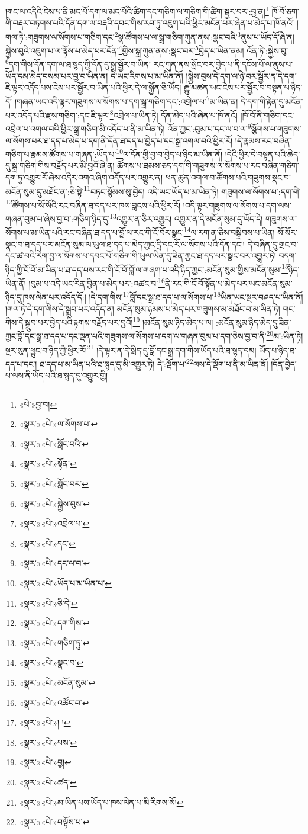 །གང་ལ་འདིའི་ངེས་པ་ནི་མང་པོ་དག་ལ་མང་པོའི་ཚིག་དང་གཅིག་ལ་གཅིག་གི་ཚིག་སྦྱར་བར་:བྱ་ན།\footnote{«པེ་»བྱ་བ།} ཁོ་བོ་ཅག་གི་བརྡར་བཏགས་པའི་དོན་དག་ལ་བརྡའི་དབང་གིས་རབ་ཏུ་འཇུག་པའི་ཕྱིར་མངོན་པར་ཞེན་པ་མེད་པ་ཁོ་ནའོ། །གལ་ཏེ་:གཟུགས་ལ་སོགས་པ་གཅིག་དང་\footnote{«སྣར་»«པེ་»ལ་སོགས་པ་}སྣ་ཚོགས་པ་ལ་སྒྲ་གཅིག་ཀུན་ནས་:སྣང་བའི་\footnote{«སྣར་»«པེ་»སློང་བའི་}ནུས་པ་ཡོད་དོ་ཞེ་ན། སྐྱེས་བུའི་འཇུག་པ་ལ་ལྟོས་པ་མེད་པར་དོན་\footnote{«སྣར་»«པེ་»སྟོན་}གྱིས་སྒྲ་ཀུན་ནས་:སྣང་བར་\footnote{«སྣར་»«པེ་»སློང་བར་}བྱེད་པ་ཡིན་ནམ། འོན་ཏེ་:སྐྱེས་བུ་\footnote{«སྣར་»«པེ་»སྐྱེས་བུས་}དག་གིས་དོན་དག་ལ་ཐ་སྙད་ཀྱི་དོན་དུ་སྒྲ་སྦྱོར་བ་ཡིན། རང་ཀུན་ནས་སློང་བར་བྱེད་པ་ནི་དངོས་པོ་ལ་ནུས་པ་ཡོད་དམ་མེད་བསམ་པར་བྱ་བ་ཡིན་ན། དེ་ཡང་རིགས་པ་མ་ཡིན་ནོ། །སྐྱེས་བུས་དེ་དག་ལ་ཉེ་བར་སྦྱོར་ན་དེ་དག་ཇི་ལྟར་འདོད་པས་ངེས་པར་སྦྱོར་བ་ཡིན་པའི་ཕྱིར་དེ་ལ་སྐྱོན་ཅི་ཡོད། རྒྱུ་མཚན་ཡང་ངེས་པར་སྦྱོར་བ་བསྟན་པ་ཉིད་དོ། །གཞན་ཡང་འདི་ལྟར་གཟུགས་ལ་སོགས་པ་དག་སྒྲ་གཅིག་དང་:འགྲེལ་པ་\footnote{«སྣར་»«པེ་»འབྲེལ་པ་}མ་ཡིན་ན། དེ་དག་གི་རྟེན་དུ་མངོན་པར་འདོད་པའི་རྫས་གཅིག་:དང་ཇི་ལྟར་\footnote{«སྣར་»«པེ་»དང་}འབྲེལ་པ་ཡིན་ཏེ། དོན་མེད་པའི་ཞེན་པ་ཁོ་ནའོ། །ཁོ་བོ་ནི་གཅིག་དང་འབྲེལ་པ་འགལ་བའི་ཕྱིར་སྒྲ་གཅིག་མི་འདོད་པ་ནི་མ་ཡིན་ཏེ། འོན་ཀྱང་:བུམ་པ་དང་ལ་བ་ལ་\footnote{«སྣར་»«པེ་»དང་ལ་བ་}སྩོགས་པ་གཟུགས་ལ་སོགས་པར་ཐ་དད་པ་མེད་པ་དག་ནི་དོན་ཐ་དད་པ་བྱེད་པ་དང་སྒྲ་འགལ་བའི་ཕྱིར་རོ། །དེ་རྣམས་རང་བཞིན་གཅིག་པ་རྣམས་ཚོགས་པ་གཞན་:ཡོད་པ་\footnote{«སྣར་»«པེ་»ཡོད་པ་མ་ཡིན་པ་}ལ་དོན་གྱི་བྱ་བ་བྱེད་པ་ཉིད་མ་ཡིན་ནོ། །དེའི་ཕྱིར་དེ་བསྟན་པའི་ཆེད་དུ་སྒྲ་གཅིག་གིས་བརྗོད་པར་མི་བྱའོ་ཞེ་ན། ཚོགས་པ་ཐམས་ཅད་དག་གི་གཟུགས་ལ་སོགས་པ་རང་བཞིན་གཅིག་དག་ཏུ་འགྱུར་རོ་ཞེས་འདིར་འགའ་ཞིག་འདོད་པར་འགྱུར་ན། ཕན་ཚུན་འགལ་བ་ཚོགས་པའི་གཟུགས་སྣང་བ་མངོན་སུམ་དུ་མཐོང་ན་:ཅི་སྟེ་\footnote{«སྣར་»«པེ་»ཅི་དེ་}བཏང་སྙོམས་སུ་བྱེད། འདི་ཡང་ཡོད་པ་མ་ཡིན་ཏེ། གཟུགས་ལ་སོགས་པ་:དག་གི་\footnote{«སྣར་»«པེ་»དག་གིས་}ཚོགས་པ་སོ་སོའི་རང་བཞིན་ཐ་དད་པར་ཁས་བླངས་པའི་ཕྱིར་རོ། །འདི་ལྟར་གཟུགས་ལ་སོགས་པ་དག་ལས་གཞན་བུམ་པ་ཞེས་བྱ་བ་:གཅིག་ཉིད་དུ་\footnote{«སྣར་»«པེ་»གཅིག་ཏུ་}འགྱུར་ན་ཅིར་འགྱུར། འགྱུར་ན་དེ་མངོན་སུམ་དུ་ཡོད་དེ། གཟུགས་ལ་སོགས་པ་མ་ཡིན་པའི་རང་བཞིན་ཐ་དད་པ་བློ་ལ་རང་གི་ངོ་བོར་སྣང་\footnote{«སྣར་»«པེ་»སྣང་བ་}ལ་རག་ན་ཅིས་བསྒྲིབས་པ་ཡིན། སོ་སོར་སྣང་བ་ཐ་དད་པར་མངོན་སུམ་ལ་ཡུལ་ཐ་དད་པ་མེད་ཀྱང་དྲི་དང་རོ་ལ་སོགས་པའི་དོན་དང་། དེ་བཞིན་དུ་གྲང་བ་དང་ཚ་བའི་རེག་བྱ་ལ་སོགས་པ་དབང་པོ་གཅིག་གི་ཡུལ་ཡིན་དུ་ཟིན་ཀྱང་ཐ་དད་པར་སྣང་བར་འགྱུར་ཏེ། བདག་ཉིད་ཀྱི་ངོ་བོ་མ་ཡིན་པ་ཐ་དད་པས་རང་གི་ངོ་བོ་བློ་ལ་གཞག་པ་འདི་ཉིད་ཀྱང་:མངོན་སུམ་གྱིས་མངོན་སུམ་\footnote{«སྣར་»«པེ་»མངོན་སུམ་}ཉིད་ཡིན་ནོ། །བུམ་པ་འདི་ཡང་རིན་བྱིན་པ་མེད་པར་:འཚང་བ་\footnote{«སྣར་»«པེ་»འཚོང་བ་}ནི་རང་གི་ངོ་བོ་སྟོན་པ་མེད་པར་ཡང་མངོན་སུམ་ཉིད་དུ་ཁས་ལེན་པར་འདོད་དོ:། །དེ་དག་གིས་\footnote{«སྣར་»«པེ་»། །}བློ་དང་སྒྲ་ཐ་དད་པ་ལ་སོགས་པ་\footnote{«སྣར་»«པེ་»པས་}ཡིན་ཡང་སྔར་བཤད་པ་ཡིན་ནོ། །གལ་ཏེ་དེ་དག་གིས་དེ་སྒྲུབ་པར་འདོད་ན། མངོན་སུམ་ཉམས་པ་མེད་པར་གཟུགས་མ་མཐོང་བ་མ་ཡིན་ཏེ། གང་གིས་དེ་སྒྲུབ་པར་བྱེད་པའི་རྟགས་བརྗོད་པར་བྱའོ།\footnote{«སྣར་»«པེ་»བྱ།} །མངོན་སུམ་ཉིད་མེད་པ་ལ། :མངོན་སུམ་ཉིད་མེད་དུ་ཟིན་ཀྱང་བློ་དང་སྒྲ་ཐ་དད་པ་དང་ལྡན་པའི་གཟུགས་ལ་སོགས་པ་དག་ལ་གཞན་བུམ་པ་དག་ཅེས་བྱ་བ་ནི་\footnote{«སྣར་»«པེ་»ཚད་}མ་:ཡིན་ཏེ། སྔར་སུན་ཕྱུང་བ་ཉིད་ཀྱི་ཕྱིར་རོ།\footnote{«སྣར་»«པེ་»མ་ཡིན་པས་ཡོད་པ་ཁས་ལེན་པ་མི་རིགས་སོ།} །དེ་ལྟར་ན་དེ་སྲིད་དུ་བློ་དང་སྒྲ་དག་གིས་ཡོད་པའི་ཐ་སྙད་དམ། ཡོད་པ་ཉིད་ཐ་དད་པ་དང་། ཐ་དད་པ་མ་ཡིན་པའི་ཐ་སྙད་དུ་མི་འགྱུར་ཏེ། དེ་:ལྡོག་པ་\footnote{«སྣར་»«པེ་»བལྟོས་པ་}ལས་དེ་ལྡོག་པ་ནི་མ་ཡིན་ནོ། །དོན་བྱེད་པ་ལས་ནི་ཡོད་པའི་ཐ་སྙད་དུ་འགྱུར་གྱི། 